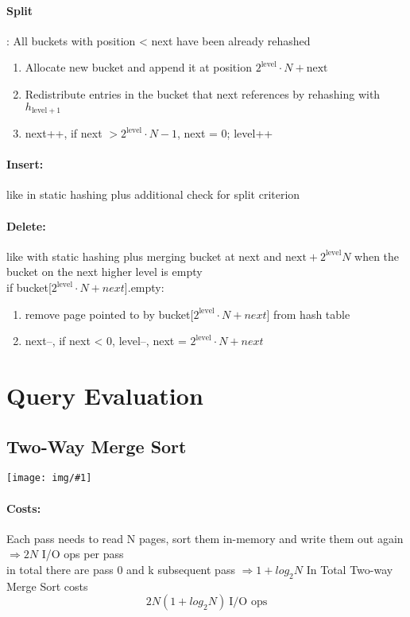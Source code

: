 \documentclass[a4paper]{article}
\newcommand{\img}[1]{\begin{center}
    \texttt{[image: img/\#1]}
\end{center} }
\begin{document}
\begin{twocolumn}
\paragraph{Split}: All buckets with position < next have been already rehashed \\
\begin{enumerate}
	\item Allocate new bucket and append it at position $2^{\text{level}} \cdot N + \text{next}$
	\item Redistribute entries in the bucket that next references by rehashing with $h_{\text{level}+1}$
	\item next++, if next $> 2^{\text{level}} \cdot N - 1$, next = 0; level++
\end{enumerate}

\paragraph{Insert:} like in static hashing plus additional check for split criterion \\

\paragraph{Delete:} like with static hashing plus merging bucket at next and $\text{next} + 2^{\text{level}} N$ when the bucket on the next higher level is empty
\\ if bucket[$2^{\text{level}} \cdot N + next$].empty:
\begin{enumerate}
	\item remove page pointed to by bucket[$2^{\text{level}} \cdot N + next$] from hash table 
	\item next--, if next < 0, level--, next = $2^{\text{level}} \cdot N + next$
\end{enumerate}





\section{Query Evaluation}

\subsection{Two-Way Merge Sort}
\img{2_way_merge_sort.png}

\paragraph{Costs:} Each pass needs to read N pages, sort them in-memory and write them out again $\Rightarrow 2N$ I/O ops per pass \\
in total there are pass 0 and k subsequent pass $\Rightarrow 1 + log_2 {N}$
In Total Two-way Merge Sort costs \[ 2 N (1+ log_2 {N}) \ \text{I/O ops}\]


\end{twocolumn}
\end{document}
